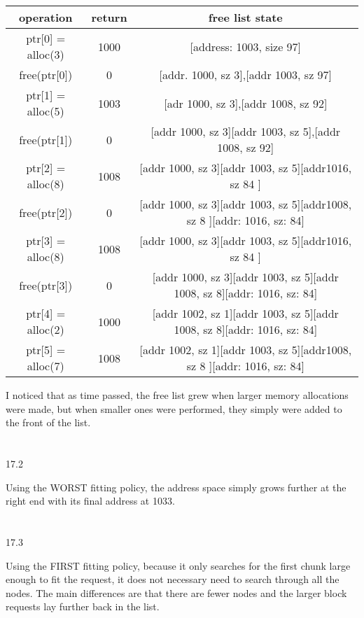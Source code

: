 \documentclass[12pt, a4paper]{article}
\begin{document}
\begin{center}
\begin{tabular}{ |c|c|c| } 
 \hline
operation & return & free list state\\ 
 \hline
 ptr[0] = alloc(3) 	& 1000 & [address: 1003, size 97] \\ 
 free(ptr[0]) 		& 0 & [addr. 1000, sz 3],[addr 1003, sz 97] \\ 
 ptr[1] = alloc(5) 	& 1003 & [adr 1000, sz 3],[addr 1008, sz 92] \\ 	
 free(ptr[1]) 		& 0 & [addr 1000, sz 3][addr 1003, sz 5],[addr 1008, sz 92] \\
 ptr[2] = alloc(8)	& 1008 & [addr 1000, sz 3][addr 1003, sz 5][addr1016, sz 84 ] \\  
 free(ptr[2]) 		& 0 &  [addr 1000, sz 3][addr 1003, sz 5][addr1008, sz 8 ][addr: 1016, sz: 84] \\ 
 ptr[3] = alloc(8) 	& 1008 &  [addr 1000, sz 3][addr 1003, sz 5][addr1016, sz 84 ] \\
 free(ptr[3]) 		& 0	 &  [addr 1000, sz 3][addr 1003, sz 5][addr 1008, sz 8][addr: 1016, sz: 84]\\
 ptr[4] = alloc(2) 	& 1000 & [addr 1002, sz 1][addr 1003, sz 5][addr 1008, sz 8][addr: 1016, sz: 84]\\
ptr[5] = alloc(7) 	& 1008 & [addr 1002, sz 1][addr 1003, sz 5][addr1008, sz 8 ][addr: 1016, sz: 84]\\
 \hline
\end{tabular}
\end{center}

I noticed that as time passed, the free list grew when larger memory allocations were made, but when smaller ones were performed, they simply were added to the front of the list. \\ \\ \\

17.2

Using the WORST fitting policy, the address space simply grows further at the right end with its final address at 1033.  \\ \\ \\

17.3

Using the FIRST fitting policy, because it only searches for the first chunk large enough to fit the request, it does not necessary need to search through all the nodes. The main differences are that there are fewer nodes and the larger block requests lay further back in the list. \\ \\ \\
\end{document}
